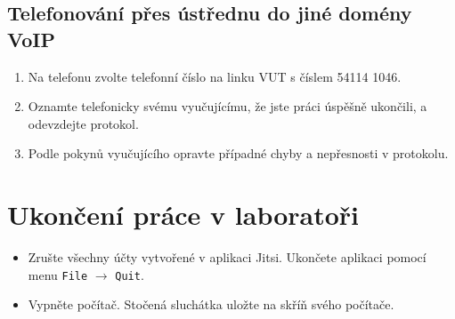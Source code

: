 \documentclass[a4paper,11pt]{article}
\begin{document}
\subsection{Telefonování přes ústřednu do jiné domény VoIP}
\begin{enumerate}
    \item Na telefonu zvolte telefonní číslo na linku VUT s číslem 54114 1046.
    \item Oznamte telefonicky svému vyučujícímu, že jste práci úspěšně ukončili, a odevzdejte protokol. 
    \item Podle pokynů vyučujícího opravte případné chyby a nepřesnosti v protokolu. 
\end{enumerate}

\section{Ukončení práce v laboratoři}
\begin{itemize}
  \item Zrušte všechny účty vytvořené v aplikaci Jitsi. Ukončete aplikaci pomocí menu {\tt File} $\rightarrow$ {\tt Quit}.
  \item Vypněte počítač. Stočená sluchátka uložte na skříň svého počítače.
\end{itemize}
\end{document}

